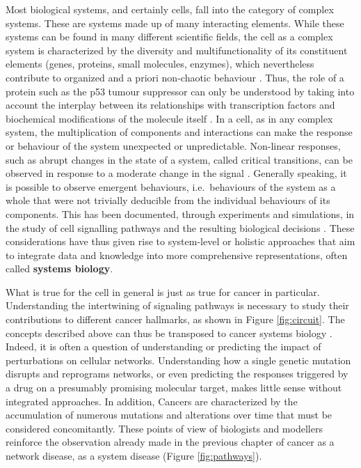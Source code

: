 \documentclass[a4paper,12pt,twoside,onecolumn,openright,final,oldfontcommands]{memoir}
\begin{document}
Most biological systems, and certainly cells, fall into the category of
complex systems. These are systems made up of many interacting elements.
While these systems can be found in many different scientific fields,
the cell as a complex system is characterized by the diversity and
multifunctionality of its constituent elements (genes, proteins, small
molecules, enzymes), which nevertheless contribute to organized and a
priori non-chaotic behaviour \citep{kitano2002computational}. Thus, the
role of a protein such as the p53 tumour suppressor can only be
understood by taking into account the interplay between its
relationships with transcription factors and biochemical modifications
of the molecule itself \citep{kitano2002computational}. In a cell, as in
any complex system, the multiplication of components and interactions
can make the response or behaviour of the system unexpected or
unpredictable. Non-linear responses, such as abrupt changes in the state
of a system, called critical transitions, can be observed in response to
a moderate change in the signal \citep{trefois2015critical}. Generally
speaking, it is possible to observe emergent behaviours, i.e.~behaviours
of the system as a whole that were not trivially deducible from the
individual behaviours of its components. This has been documented,
through experiments and simulations, in the study of cell signalling
pathways and the resulting biological decisions
\citep{bhalla1999emergent, helikar2008emergent}. These considerations
have thus given rise to system-level or holistic approaches that aim to
integrate data and knowledge into more comprehensive representations,
often called \textbf{systems biology}.

What is true for the cell in general is just as true for cancer in
particular. Understanding the intertwining of signaling pathways is
necessary to study their contributions to different cancer hallmarks, as
shown in Figure \ref{fig:circuit}. The concepts described above can thus
be transposed to cancer systems biology
\citep{hornberg2006cancer, kreeger2010cancer, barillot2012computational}.
Indeed, it is often a question of understanding or predicting the impact
of perturbations on cellular networks. Understanding how a single
genetic mutation disrupts and reprograms networks, or even predicting
the responses triggered by a drug on a presumably promising molecular
target, makes little sense without integrated approaches. In addition,
Cancers are characterized by the accumulation of numerous mutations and
alterations over time that must be considered concomitantly. These
points of view of biologists and modellers reinforce the observation
already made in the previous chapter of cancer as a network disease, as
a system disease (Figure \ref{fig:pathways}).
\end{document}
